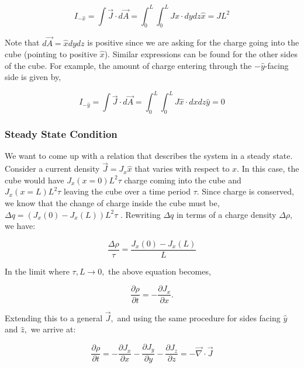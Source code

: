 \documentclass[12pt]{book}
\begin{document}
\begin{equation*}
I_{-\hat{x}} = \int \vec{J}\cdot d\vec{A} = \int_0^L \int_0^L J \hat{x} \cdot dy dz \hat{x} = J L^2 
\end{equation*}

Note that $d\vec{A} = \hat{x} dy dz$ is positive since we are asking for the charge going into the cube (pointing to positive $\hat{x}$). Similar expressions can be found for the other sides of the cube. For example, the amount of charge entering through the $-\hat{y}$-facing side is given by,

\begin{equation*}
I_{-\hat{y}} = \int \vec{J}\cdot d\vec{A} = \int_0^L \int_0^L J \hat{x} \cdot dx dz \hat{y} =  0
\end{equation*}


\subsubsection{Steady State Condition}

We want to come up with a relation that describes the system in a steady state. Consider a current density
$\vec{J} = J_x \hat{x}$ that varies with respect to $x$. In this case, the cube would have $J_x(x = 0)L^2 \tau$ charge coming into the cube and $J_x(x = L)L^2\tau$ leaving the cube over a time period $\tau$. Since charge is conserved, we know that the change of charge inside the cube must be, $\Delta q = (J_x (0) − J_x (L))L^2 \tau$ . Rewriting $\Delta q$ in terms of a charge density $\Delta \rho$, we have:

\begin{equation*}
 \frac{\Delta \rho}{\tau} =  \frac{J_x (0) − J_x (L)}{L}
\end{equation*}

In the limit where $\tau,L \to 0,$ the above equation becomes,

\begin{equation*}
 \frac{\partial \rho}{\partial t} = -\frac{\partial J_x}{\partial x}.
\end{equation*}

Extending this to a general $\vec{J},$ and using the same procedure for sides facing $\hat{y}$ and $\hat{z},$ we arrive at:

\begin{equation}
 \frac{\partial \rho}{\partial t} = -\frac{\partial J_x}{\partial x}-\frac{\partial J_y}{\partial y}-\frac{\partial J_z}{\partial z} = - \vec{\nabla}\cdot \vec{J}
\end{equation}
\end{document}
